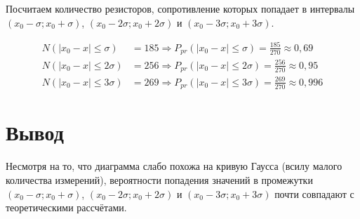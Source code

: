 \documentclass[a4paper, 12pt]{article}
\begin{document}
Посчитаем количество резисторов, сопротивление которых попадает в интервалы $(x_0 - \sigma; x_0 + \sigma)$, $(x_0 - 2\sigma; x_0 + 2\sigma)$
и $(x_0 - 3\sigma; x_0 + 3\sigma)$.

\begin{align*}
N(|x_0 - x| \leq \sigma) &= 185 \Rightarrow P_{pr}(|x_0 - x| \leq \sigma) = \frac{185}{270} \approx 0,69   \\
N(|x_0 - x| \leq 2\sigma) &= 256 \Rightarrow P_{pr}(|x_0 - x| \leq 2\sigma) = \frac{256}{270} \approx 0,95 \\
N(|x_0 - x| \leq 3\sigma) &= 269 \Rightarrow P_{pr}(|x_0 - x| \leq 3\sigma) = \frac{269}{270} \approx 0,996
\end{align*}

\section{Вывод}

Несмотря на то, что диаграмма слабо похожа на кривую Гаусса (всилу малого количества измерений), вероятности попадения
значений в промежутки $(x_0 - \sigma; x_0 + \sigma)$, $(x_0 - 2\sigma; x_0 + 2\sigma)$
и $(x_0 - 3\sigma; x_0 + 3\sigma)$ почти совпадают с теоретическими рассчётами.
\end{document}
